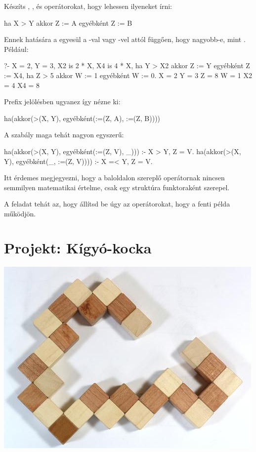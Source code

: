 \begin{problem}
\item Készíts , ,
 és \pr{:=} operátorokat, hogy
lehessen ilyeneket írni:
\begin{query}
ha X > Y akkor Z := A egyébként Z := B
\end{query}
Ennek hatására a  egyesül a -val vagy -vel
attól függően, hogy  nagyobb-e, mint . Például:
\begin{query}
?- X = 2, Y = 3,
   X2 is 2 * X, X4 is 4 * X,
   ha Y > X2 akkor Z := Y egyébként Z := X4,
   ha Z > 5 akkor W := 1 egyébként W := 0.
X = 2
Y = 3
Z = 8
W = 1
X2 = 4
X4 = 8
\end{query}

Prefix jelölésben ugyanez így nézne ki:
\begin{query}
ha(akkor(>(X, Y), egyébként(:=(Z, A), :=(Z, B))))
\end{query}
A szabály maga tehát nagyon egyszerű:
\begin{program}
ha(akkor(>(X, Y), egyébként(:=(Z, V), _))) :-
    X > Y, Z = V.
ha(akkor(>(X, Y), egyébként(_, :=(Z, V)))) :-
    X =< Y, Z = V.
\end{program}
Itt érdemes megjegyezni, hogy a baloldalon szereplő
\pr{>} operátornak nincsen semmilyen matematikai
értelme, csak egy struktúra funktoraként szerepel.

A feladat tehát az, hogy állítsd be úgy az
operátorokat, hogy a fenti példa működjön.
\end{problem}

\section{Projekt: Kígyó-kocka}

\begin{center}
\includegraphics[width=.6\textwidth]{images/snake-cube.jpg}
\end{center}

